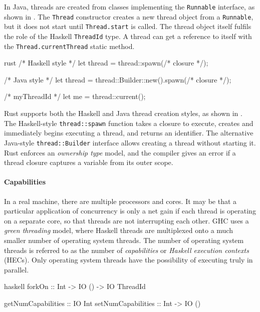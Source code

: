 In Java\cite{lea1996}, threads are created from classes implementing
the \verb|Runnable| interface, as shown in .  The
\verb|Thread| constructor creates a new thread object from a
\verb|Runnable|, but it does not start until \verb|Thread.start| is
called.  The thread object itself fulfils the role of the Haskell
\verb|ThreadId| type.  A thread can get a reference to itself with the
\verb|Thread.currentThread| static method.

\begin{listing}
\centering
\begin{cminted}{rust}
/* Haskell style */
let thread = thread::spawn(/* closure */);

/* Java style */
let thread = thread::Builder::new().spawn(/* closure */);

/* myThreadId */
let me = thread::current();
\end{cminted}
\caption{Basic threading operations in Rust.}\label{lst:basic_rust}
\end{listing}

Rust\cite{rust2011} supports both the Haskell and Java thread creation
styles, as shown in .  The Haskell-style
\verb|thread::spawn| function takes a closure to execute, creates and
immediately begins executing a thread, and returns an identifier.  The
alternative Java-style \verb|thread::Builder| interface allows
creating a thread without starting it.  Rust enforces an
\emph{ownership type} model, and the compiler gives an error if a
thread closure captures a variable from its outer scope.

\paragraph{Capabilities}
In a real machine, there are multiple processors and cores.  It may be
that a particular application of concurrency is only a net gain if
each thread is operating on a separate core, so that threads are not
interrupting each other.  GHC uses a \emph{green threading} model,
where Haskell threads are multiplexed onto a much smaller number of
operating system threads\cite{marlow2009}.  The number of operating
system threads is referred to as the number of \emph{capabilities} or
\emph{Haskell execution contexts} (HECs)\cite{marlow2009}.  Only
operating system threads have the possibility of executing truly in
parallel.

\begin{listing}
\centering
\begin{cminted}{haskell}
forkOn             :: Int -> IO () -> IO ThreadId

getNumCapabilities :: IO Int
setNumCapabilities :: Int -> IO ()
\end{cminted}
\caption{Operating system threads in Haskell.}\label{lst:caps_haskell}
\end{listing}


